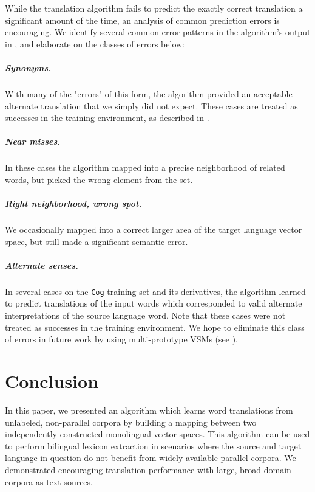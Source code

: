 \documentclass[11pt]{article}
\begin{document}
While the translation algorithm fails to predict the exactly correct translation a
significant amount of the time, an analysis of common prediction errors is encouraging.
We identify several common error patterns in the
algorithm's output in , and elaborate on the classes of errors below:
\subparagraph{Synonyms.} With many of the "errors" of this form, the algorithm provided an acceptable alternate translation that we simply did
not expect. These cases are treated as successes in the  training environment, as described
in .
\subparagraph{Near misses.} In these cases the algorithm mapped into a precise neighborhood
of related words, but picked the wrong element from the set. %
\subparagraph{Right neighborhood, wrong spot.} We occasionally mapped into a correct larger
area of the target language vector space, but still made a significant semantic error.
\subparagraph{Alternate senses.} In several cases on the \texttt{Cog} training
set and its derivatives, the algorithm learned to predict translations of the input words which
corresponded to valid alternate interpretations of the source language word.
Note that these cases were not treated as
successes in the  training environment. We hope to eliminate this class of errors
in future work by using multi-prototype VSMs (see ).


\section{Conclusion}
\label{sec:conclusion}

In this paper, we presented an algorithm which learns word translations from unlabeled,
non-parallel corpora by building a mapping between two independently constructed
monolingual vector spaces. This algorithm can be used to perform bilingual lexicon
extraction in scenarios where the source and target language in question do not benefit
from widely available parallel corpora. We demonstrated encouraging translation
performance with large, broad-domain corpora as text sources.
\end{document}

